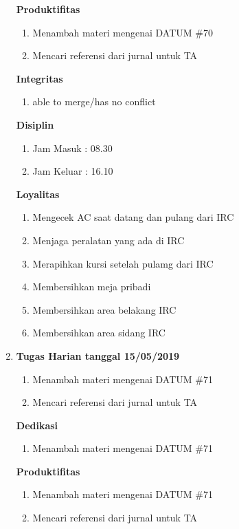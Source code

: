 \begin{enumerate}
\textbf{Produktifitas}
\begin{enumerate}
\item Menambah materi mengenai DATUM \#70
\item Mencari referensi dari jurnal untuk TA
\end{enumerate}

\textbf{Integritas}
\begin{enumerate}
\item able to merge/has no conflict
\end{enumerate}

\textbf{Disiplin}
\begin{enumerate}
\item Jam Masuk : 08.30
\item Jam Keluar : 16.10
\end{enumerate}

\textbf{Loyalitas}
\begin{enumerate}
\item Mengecek AC saat datang dan pulang dari IRC
\item Menjaga peralatan yang ada di IRC
\item Merapihkan kursi setelah pulamg dari IRC
\item Membersihkan meja pribadi
\item Membersihkan area belakang IRC
\item Membersihkan area sidang IRC
\end{enumerate}



\item \textbf{Tugas Harian tanggal 15/05/2019}
\begin{enumerate}
\item Menambah materi mengenai DATUM \#71
\item Mencari referensi dari jurnal untuk TA
\end{enumerate}

\textbf{Dedikasi}
\begin{enumerate}
\item Menambah materi mengenai DATUM \#71
\end{enumerate}

\textbf{Produktifitas}
\begin{enumerate}
\item Menambah materi mengenai DATUM \#71
\item Mencari referensi dari jurnal untuk TA
\end{enumerate}


\end{enumerate}
